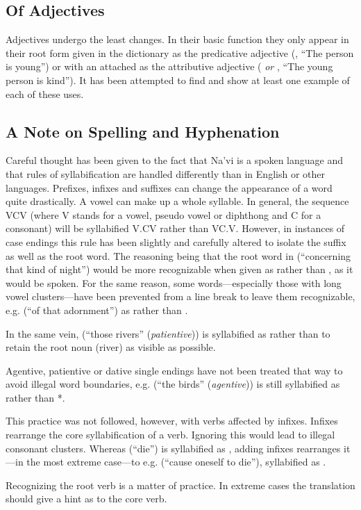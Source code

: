 \subsection*{Of Adjectives}

Adjectives undergo the least changes. In their basic function they only appear in their root form given in the dictionary as the predicative adjective (, ``The person is young'') or with an attached  as the attributive adjective ( \emph{or} , ``The young person is kind''). It has been attempted to find and show at least one example of each of these uses.

\subsection*{A Note on Spelling and Hyphenation}

Careful thought has been given to the fact that Na'vi is a spoken language and that rules of syllabification are handled differently than in English or other languages. Prefixes, infixes and suffixes can change the appearance of a word quite drastically. A vowel can make up a whole syllable. In general, the sequence VCV (where V stands for a vowel, pseudo vowel or diphthong and C for a consonant) will be syllabified V.CV rather than VC.V. However, in instances of case endings this rule has been slightly and carefully altered to isolate the suffix as well as the root word. The reasoning being that the root word in  (``concerning that kind of night'') would be more recognizable when given as  rather than , as it would be spoken. For the same reason, some words---especially those with long vowel clusters---have been prevented from a line break to leave them recognizable, e.g.  (``of that adornment'') as  rather than . 

In the same vein,  (``those rivers'' (\emph{patientive})) is syllabified as  rather than  to retain the root noun  (river) as visible as possible.

Agentive, patientive or dative single endings have not been treated that way to avoid illegal word boundaries, e.g.  (``the birds'' (\emph{agentive})) is still syllabified as  rather than *.

This practice was not followed, however, with verbs affected by infixes. Infixes rearrange the core syllabification of a verb. Ignoring this would lead to illegal consonant clusters. Whereas  (``die'') is syllabified as , adding infixes rearranges it---in the most extreme case---to e.g.  (``cause oneself to die''), syllabified as . 

Recognizing the root verb is a matter of practice. In extreme cases the translation should give a hint as to the core verb.


